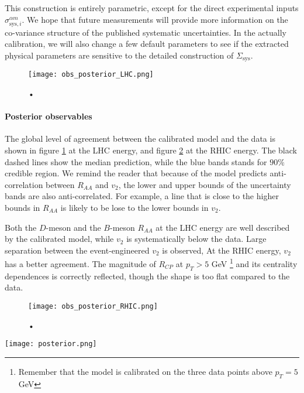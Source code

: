 This construction is entirely parametric, except for the direct experimental inputs $\sigma^{\alpha m}_{\textrm{sys}, i}$.
We hope that future measurements will provide more information on the co-variance structure of the published systematic uncertainties.
In the actually calibration, we will also change a few default parameters to see if the extracted physical parameters are sensitive to the detailed construction of $\Sigma_{\textrm{sys}}$.

\begin{figure}
\centering
\texttt{[image: obs\_posterior\_LHC.png]}
\caption{•}
\label{fig:new:obs_posterior_LHC}
\end{figure}

\paragraph{Posterior observables} The global level of agreement between the calibrated model and the data is shown in figure \ref{fig:new:obs_posterior_LHC} at the LHC energy, and figure \ref{fig:new:obs_posterior_RHIC} at the RHIC energy.
The black dashed lines show the median prediction, while the blue bands stands for $90\%$ credible region.
We remind the reader that because of the model predicts anti-correlation between $R_{AA}$ and $v_2$, the lower and upper bounds of the uncertainty bands are also anti-correlated.
For example, a line that is close to the higher bounds in $R_{AA}$ is likely to be lose to the lower bounds in $v_2$.

Both the $D$-meson and the $B$-meson $R_{AA}$ at the LHC energy are well described by the calibrated model, while $v_2$ is systematically below the data.
Large separation between the event-engineered $v_2$ is observed, 
At the RHIC energy, $v_2$ has a better agreement. 
The magnitude of $R_{CP}$ at $p_T> 5$ GeV \footnote{Remember that the model is calibrated on the three data points above $p_T=5$ GeV} and its centrality dependences is correctly reflected, though the shape is too flat compared to the data.

\begin{figure}
\centering
\texttt{[image: obs\_posterior\_RHIC.png]}
\caption{•}
\label{fig:new:obs_posterior_RHIC}
\end{figure}

\begin{figure*}
\centering
\texttt{[image: posterior.png]}
\caption{•}
\label{fig:new:posterior}
\end{figure*}

